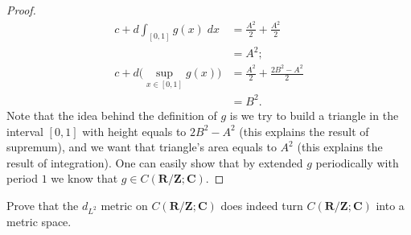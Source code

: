 \begin{proof}
\begin{align*}
        c + d \int_{[0, 1]} g(x) \; dx           & = \frac{A^2}{2} + \frac{A^2}{2}         \\
                                                 & = A^2;                                  \\
        c + d \big(\sup_{x \in [0, 1]} g(x)\big) & = \frac{A^2}{2} + \frac{2 B^2 - A^2}{2} \\
                                                 & = B^2.
    \end{align*}
    Note that the idea behind the definition of \(g\) is we try to build a triangle in the interval \([0, 1]\) with height equals to \(2 B^2 - A^2\) (this explains the result of supremum), and we want that triangle's area equals to \(A^2\) (this explains the result of integration).
    One can easily show that by extended \(g\) periodically with period \(1\) we know that \(g \in C(\mathbf{R} / \mathbf{Z} ; \mathbf{C})\).
\end{proof}

\begin{exercise}\label{ex 5.2.4}
    Prove that the \(d_{L^2}\) metric on \(C(\mathbf{R} / \mathbf{Z} ; \mathbf{C})\) does indeed turn \(C(\mathbf{R} / \mathbf{Z} ; \mathbf{C})\) into a metric space.
\end{exercise}

